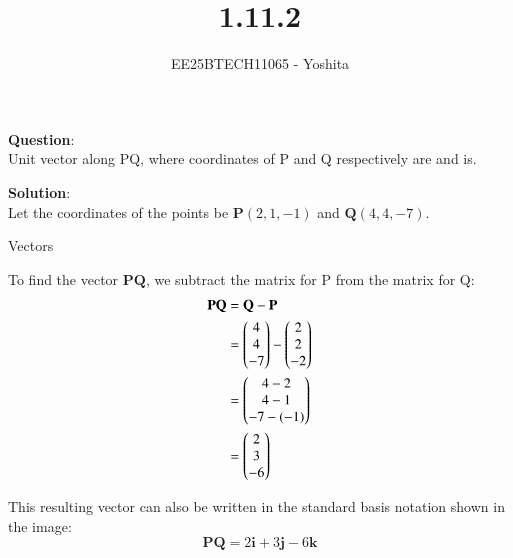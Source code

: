 \documentclass[journal]{IEEEtran}
\begin{document}

\vspace{3cm}

\title{1.11.2}
\author{EE25BTECH11065 - Yoshita}
{\let\newpage\relax\maketitle}

\renewcommand{\thefigure}{\theenumi}
\renewcommand{\thetable}{\theenumi}
\setlength{\intextsep}{10pt} %
\textbf{Question}:\\
    Unit vector along PQ, where coordinates of P and Q respectively are  and  is.\\
\bigskip

\textbf{Solution}:\\
Let the coordinates of the points be $\mathbf{P}(2, 1, -1)$ and $\mathbf{Q}(4, 4, -7)$.
\begin{table}[H]    
  \centering
  
  \caption{Vectors}
  \label{Answers}
\end{table}
To find the vector \(\mathbf{PQ}\), we subtract the matrix for P from the matrix for Q:
\begin{align}
    \mathbf{PQ} &= \mathbf{Q} - \mathbf{P} \\
    &= 
   \begin{pmatrix}4\\4\\-7\end{pmatrix}
    -
    \begin{pmatrix}2\\2\\-2\end{pmatrix} \\
    &= 
    \begin{pmatrix}4-2\\4-1\\-7-(-1)\end{pmatrix} \\
    &= 
    \begin{pmatrix}2\\3\\-6\end{pmatrix}
\end{align}

This resulting vector can also be written in the standard basis notation shown in the image:
\[
\mathbf{PQ} = 2\mathbf{i} + 3\mathbf{j} - 6\mathbf{k}
\]
\end{document}
